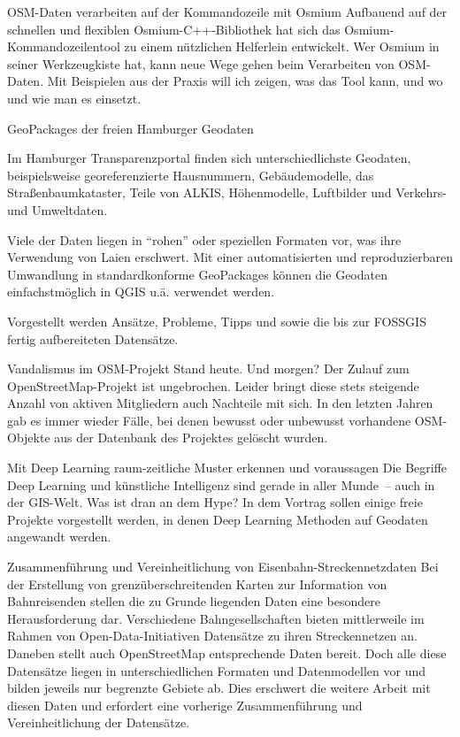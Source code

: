 %
{OSM-Daten verarbeiten auf der \mbox{Kommandozeile} mit Osmium}%
{}%
{Aufbauend auf der schnellen und flexiblen Osmium-C++-Bibliothek hat sich das
Osmium-Kommandozeilentool zu einem nützlichen Helferlein entwickelt. Wer Osmium in seiner
Werkzeugkiste hat, kann neue Wege gehen beim Verarbeiten von OSM-Daten. Mit Beispielen aus der
Praxis will ich zeigen, was das Tool kann, und wo und wie man es einsetzt.}

%
{GeoPackages der freien Hamburger Geodaten}%
{}%
{Im Hamburger Transparenzportal finden sich unterschiedlichste Geodaten, beispielsweise georeferenzierte
  Hausnummern, Gebäudemodelle, das Straßenbaumkataster, Teile von ALKIS, Höhenmodelle, Luftbilder und
  Verkehrs- und Umweltdaten.

Viele der Daten liegen in "`rohen"' oder speziellen Formaten vor, was ihre Verwendung von Laien
erschwert. Mit einer automatisierten und reproduzierbaren Umwandlung in standardkonforme GeoPackages
können die Geodaten einfachstmöglich in QGIS u.ä. verwendet werden.

Vorgestellt werden Ansätze, Probleme, Tipps und sowie die bis zur FOSSGIS fertig aufbereiteten
Datensätze.}

%
{Vandalismus im OSM-Projekt}%
{Stand heute. Und morgen?}%
{
Der Zulauf zum OpenStreetMap-Projekt ist ungebrochen. Leider bringt diese stets
steigende Anzahl von aktiven Mitgliedern auch Nachteile mit sich. In den
letzten Jahren gab es immer wieder Fälle, bei denen bewusst oder unbewusst
vorhandene OSM-Objekte aus der Datenbank des Projektes gelöscht wurden.}

%
{Mit Deep Learning raum-zeitliche Muster erkennen und voraussagen}%
{}%
{Die Begriffe Deep Learning und künstliche Intelligenz sind gerade in aller Munde~--
auch in der GIS-Welt. Was ist dran an dem Hype? In dem Vortrag sollen einige
freie Projekte vorgestellt werden, in denen Deep Learning Methoden auf Geodaten
angewandt werden.}

%
{Zusammenführung und Vereinheitlichung von Eisenbahn-Streckennetzdaten}%
{}%
{Bei der Erstellung von grenzüberschreitenden Karten zur Information von Bahnreisenden stellen die
zu Grunde liegenden Daten eine besondere Herausforderung dar. Verschiedene Bahngesellschaften bieten
mittlerweile im Rahmen von Open-Data-Initiativen Datensätze zu ihren Streckennetzen an. Daneben
stellt auch OpenStreetMap entsprechende Daten bereit. Doch alle diese Datensätze liegen in
unterschiedlichen Formaten und Datenmodellen vor und bilden jeweils nur begrenzte Gebiete ab. Dies
erschwert die weitere Arbeit mit diesen Daten und erfordert eine vorherige Zusammenführung und
Vereinheitlichung der Datensätze.}

